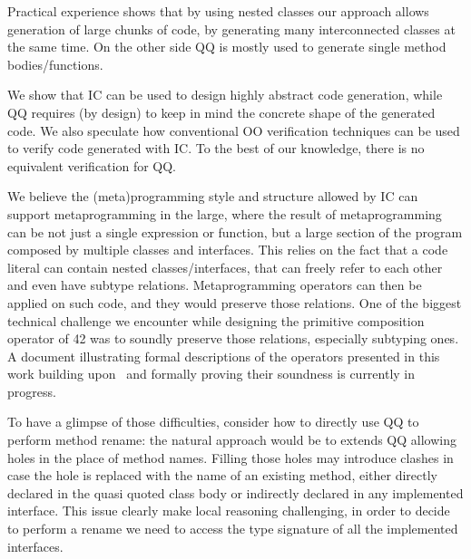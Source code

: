 Practical experience shows that by using nested classes our approach allows generation of large chunks of code,
by generating many interconnected classes at the same time. On the other side QQ is mostly used to generate single method bodies/functions.

We show that IC can be used to design highly abstract code generation, 
while QQ requires (by design) to keep in mind the concrete shape of the generated code.
We also speculate how conventional OO verification techniques can be
used to verify code generated with IC. To the best of our knowledge, there is no
equivalent verification for QQ.

We believe the (meta)programming style and structure allowed by IC
can support metaprogramming in the large, where the result of metaprogramming can be not just
a single expression or function, but a large section of the program composed by multiple
classes and interfaces. This relies on the fact that a code literal can contain nested classes/interfaces,
that can freely refer to each other and even have subtype relations.
Metaprogramming operators
can then be applied on such code, 
and they would preserve those relations.
One of the biggest technical challenge we encounter while designing the primitive composition operator of 42 was to soundly preserve those relations, especially subtyping ones.
A document illustrating formal descriptions of the operators presented in this work building upon~\cite{servetto2014meta} and formally proving 
their soundness is currently in progress.

To have a glimpse of those difficulties, consider how to directly use QQ to perform method rename:
the natural approach would be to extends QQ allowing
 holes in the place of method names.
Filling those holes may introduce clashes in case
the hole is replaced with the name of an existing method,
either directly declared in the quasi quoted class body or indirectly declared in any implemented interface.
This issue clearly make local reasoning challenging, in order to decide to perform a
rename we need to access the type signature of all the implemented interfaces.

